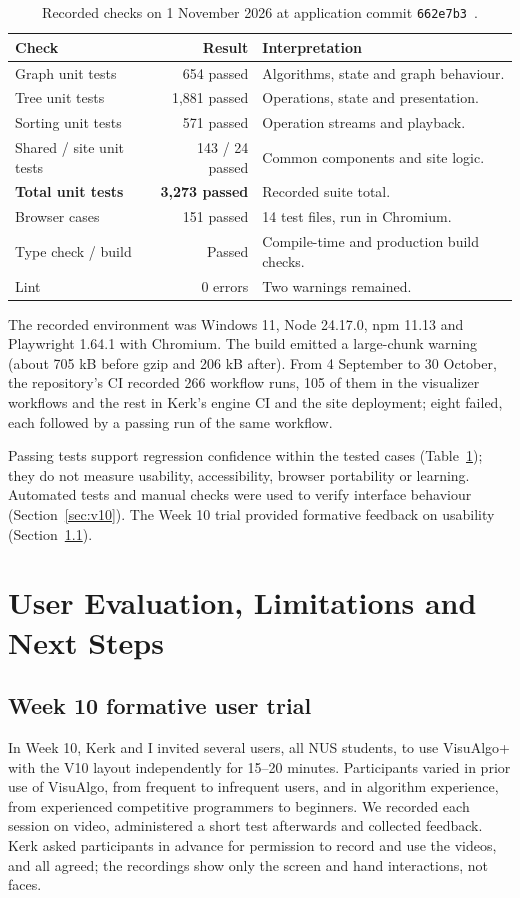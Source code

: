 \documentclass[11pt,a4paper]{article}
\newcommand{\code}[1]{\texttt{#1}}
\newcommand{\page}{\par\Needspace{5\baselineskip}\vspace{6pt}}
\begin{document}
\begin{table}[tbp]\centering\small
\caption{Recorded checks on 1 November 2026 at application commit \code{662e7b3}~\cite{validation}.}\label{tab:tests}
\begin{tabularx}{\linewidth}{@{}XrX@{}}\toprule
Check & Result & Interpretation\\\midrule
Graph unit tests & 654 passed & Algorithms, state and graph behaviour.\\
Tree unit tests & 1,881 passed & Operations, state and presentation.\\
Sorting unit tests & 571 passed & Operation streams and playback.\\
Shared / site unit tests & 143 / 24 passed & Common components and site logic.\\
\textbf{Total unit tests} & \textbf{3,273 passed} & Recorded suite total.\\
Browser cases & 151 passed & 14 test files, run in Chromium.\\
Type check / build & Passed & Compile-time and production build checks.\\
Lint & 0 errors & Two warnings remained.\\\bottomrule
\end{tabularx}
\end{table}

The recorded environment was Windows 11, Node 24.17.0, npm 11.13 and Playwright 1.64.1 with Chromium. The build emitted a large-chunk warning (about 705 kB before gzip and 206 kB after). From 4 September to 30 October, the repository's CI recorded 266 workflow runs, 105 of them in the visualizer workflows and the rest in Kerk's engine CI and the site deployment; eight failed, each followed by a passing run of the same workflow.

Passing tests support regression confidence within the tested cases (Table~\ref{tab:tests}); they do not measure usability, accessibility, browser portability or learning. Automated tests and manual checks were used to verify interface behaviour (Section~\ref{sec:v10}). The Week 10 trial provided formative feedback on usability (Section~\ref{sec:trial}).

\page
\section{User Evaluation, Limitations and Next Steps}
\subsection{Week 10 formative user trial}\label{sec:trial}
In Week 10, Kerk and I invited several users, all NUS students, to use VisuAlgo+ with the V10 layout independently for 15--20 minutes. Participants varied in prior use of VisuAlgo, from frequent to infrequent users, and in algorithm experience, from experienced competitive programmers to beginners. We recorded each session on video, administered a short test afterwards and collected feedback. Kerk asked participants in advance for permission to record and use the videos, and all agreed; the recordings show only the screen and hand interactions, not faces.
\end{document}
